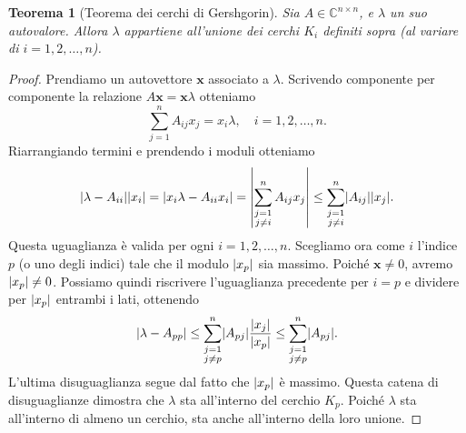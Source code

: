 \documentclass[a4paper]{report}
\DeclarePairedDelimiter{\abs}{\lvert}{\rvert}
\newtheorem{theorem}{Teorema}[chapter]
\theoremstyle{definition}
\theoremstyle{remark}
\begin{document}
\begin{theorem}[Teorema dei cerchi di Gershgorin]
Sia $A\in\mathbb{C}^{n\times n}$, e $\lambda$ un suo autovalore. Allora $\lambda$ appartiene all'unione dei cerchi $K_i$ definiti sopra (al variare di $i=1,2,\dots,n$).
\end{theorem}
\begin{proof}
Prendiamo un autovettore $\mathbf{x}$ associato a $\lambda$. Scrivendo componente per componente la relazione $A\mathbf{x} = \mathbf{x}\lambda$ otteniamo
\[
\sum_{j=1}^n A_{ij}x_j = x_i \lambda, \quad i=1,2,\dots,n.
\]
Riarrangiando termini e prendendo i moduli otteniamo
\[
\abs{\lambda - A_{ii}}\abs{x_i} = \abs{x_i\lambda - A_{ii}x_i} = \abs*{\sum_{\substack{j=1\\ j \neq i}}^n A_{ij}x_j} \leq \sum_{\substack{j=1\\ j \neq i}}^n \abs{A_{ij}}\abs{x_j}.
\]
Questa uguaglianza è valida per ogni $i=1,2,\dots,n$. Scegliamo ora come $i$ l'indice $p$ (o uno degli indici) tale che il modulo $\abs{x_p}$ sia massimo. Poiché $\mathbf{x}\neq 0$, avremo $\abs{x_p} \neq 0$. Possiamo quindi riscrivere l'uguaglianza precedente per $i=p$ e dividere per $\abs{x_p}$ entrambi i lati, ottenendo
\[
\abs{\lambda - A_{pp}} \leq \sum_{\substack{j=1\\ j \neq p}}^n \abs{A_{pj}}\frac{\abs{x_j}}{\abs{x_p}} \leq \sum_{\substack{j=1\\ j \neq p}}^n \abs{A_{pj}}.
\]
L'ultima disuguaglianza segue dal fatto che $\abs{x_p}$ è massimo. Questa catena di disuguaglianze dimostra che $\lambda$ sta all'interno del cerchio $K_p$. Poiché $\lambda$ sta all'interno di almeno un cerchio, sta anche all'interno della loro unione.
\end{proof}
\end{document}
